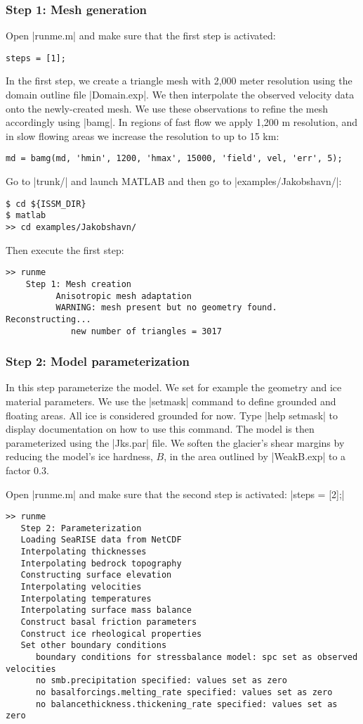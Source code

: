 \subsubsection{Step 1: Mesh generation}
Open \lstinlinebg|runme.m| and make sure that the first step is activated:
\begin{lstlisting}
steps = [1];
\end{lstlisting}
In the first step, we create a triangle mesh with 2,000 meter resolution using the domain outline file \lstinlinebg|Domain.exp|. We then interpolate the observed velocity data onto the newly-created mesh. We use these observations to refine the mesh accordingly using \lstinlinebg|bamg|. In regions of fast flow we apply 1,200 m resolution, and in slow flowing areas we increase the resolution to up to 15 km:
\begin{lstlisting}
md = bamg(md, 'hmin', 1200, 'hmax', 15000, 'field', vel, 'err', 5);
\end{lstlisting}

Go to \lstinlinebg|trunk/| and launch MATLAB and then go to \lstinlinebg|examples/Jakobshavn/|:
\begin{lstlisting}
$ cd ${ISSM_DIR}
$ matlab
>> cd examples/Jakobshavn/
\end{lstlisting}

Then execute the first step:
\begin{lstlisting}
>> runme
	Step 1: Mesh creation
		  Anisotropic mesh adaptation
		  WARNING: mesh present but no geometry found. Reconstructing...
		     new number of triangles = 3017
\end{lstlisting}

\subsubsection{Step 2: Model parameterization}
In this step parameterize the model. We set for example the geometry and ice material parameters. We use the \lstinlinebg|setmask| command to define grounded and floating areas. All ice is considered grounded for now. Type \lstinlinebg|help setmask| to display documentation on how to use this command. The model is then parameterized using the \lstinlinebg|Jks.par| file. We soften the glacier's shear margins by reducing the model's ice hardness, $B$, in the area outlined by \lstinlinebg|WeakB.exp| to a factor 0.3.

Open \lstinlinebg|runme.m| and make sure that the second step is activated: \lstinlinebg|steps = [2];|
\begin{lstlisting}
>> runme
   Step 2: Parameterization
   Loading SeaRISE data from NetCDF
   Interpolating thicknesses
   Interpolating bedrock topography
   Constructing surface elevation
   Interpolating velocities
   Interpolating temperatures
   Interpolating surface mass balance
   Construct basal friction parameters
   Construct ice rheological properties
   Set other boundary conditions
      boundary conditions for stressbalance model: spc set as observed velocities
      no smb.precipitation specified: values set as zero
      no basalforcings.melting_rate specified: values set as zero
      no balancethickness.thickening_rate specified: values set as zero
\end{lstlisting}

